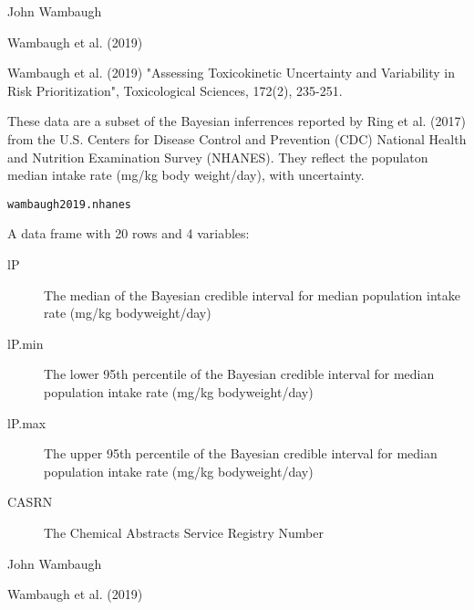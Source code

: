\documentclass[a4paper]{book}
\begin{document}
%
\begin{Author}\relax
John Wambaugh
\end{Author}
%
\begin{Source}\relax
Wambaugh et al. (2019)
\end{Source}
%
\begin{References}\relax
Wambaugh et al. (2019) "Assessing Toxicokinetic Uncertainty and
Variability in Risk Prioritization", Toxicological Sciences, 172(2), 235-251.
\end{References}
%
\begin{Description}\relax
These data are a subset of the Bayesian inferrences reported by Ring et al.
(2017) from the U.S. Centers for Disease Control and Prevention (CDC)
National Health and Nutrition Examination Survey (NHANES). They reflect the
populaton median intake rate (mg/kg body weight/day), with uncertainty.
\end{Description}
%
\begin{Usage}
\begin{verbatim}
wambaugh2019.nhanes
\end{verbatim}
\end{Usage}
%
\begin{Format}
A data frame with 20 rows and 4 variables:
\begin{description}

\item[lP] The median of the Bayesian credible interval for median population
intake rate (mg/kg bodyweight/day)
\item[lP.min] The lower 95th percentile of the Bayesian credible interval for median population
intake rate (mg/kg bodyweight/day)
\item[lP.max] The upper 95th percentile of the Bayesian credible interval for median population
intake rate (mg/kg bodyweight/day)
\item[CASRN] The Chemical Abstracts Service Registry Number

\end{description}

\end{Format}
%
\begin{Author}\relax
John Wambaugh
\end{Author}
%
\begin{Source}\relax
Wambaugh et al. (2019)
\end{Source}
\end{document}

